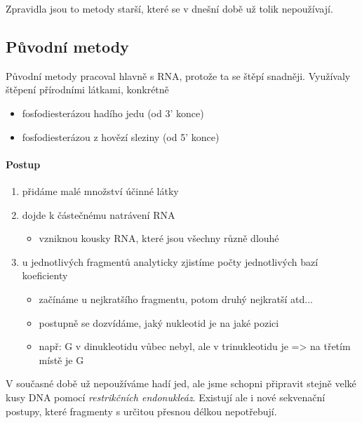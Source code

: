 \documentclass[DIV=8]{scrreprt}
\begin{document}
Zpravidla jsou to metody starší, které se v dnešní době už tolik nepoužívají.

\subsection{Původní metody} \label{Původní metody}


Původní metody pracoval hlavně s RNA, protože ta se štěpí snadněji. Využívaly štěpení přírodními látkami, konkrétně
\begin{itemize}[nosep]
    \item fosfodiesterázou hadího jedu (od 3' konce)
    \item fosfodiesterázou z hovězí sleziny (od 5' konce)
\end{itemize}



\paragraph{Postup}
\begin{enumerate}[nosep]
    \item přidáme malé množství účinné látky
    \item dojde k částečnému natrávení RNA
\begin{itemize}[nosep]
    \item vzniknou kousky RNA, které jsou všechny různě dlouhé
\end{itemize}

    \item u jednotlivých fragmentů analyticky zjistíme počty jednotlivých bazí koeficienty
\begin{itemize}[nosep]
    \item začínáme u nejkratšího fragmentu, potom druhý nejkratší atd...
    \item postupně se dozvídáme, jaký nukleotid je na jaké pozici
    \item např: G v dinukleotidu vůbec nebyl, ale v trinukleotidu je => na třetím místě je G
\end{itemize}

\end{enumerate}



V současné době už nepoužíváme hadí jed, ale jsme schopni připravit stejně velké kusy DNA pomocí \emph{restrikčních endonukleáz}. Existují ale i nové sekvenační postupy, které fragmenty s určitou přesnou délkou nepotřebují.
\end{document}

